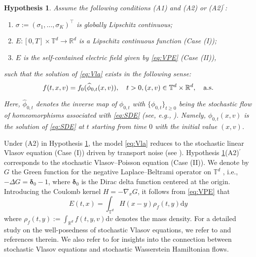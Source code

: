 \documentclass[11pt,reqno]{amsproc}
\newtheorem{hypothesis}[Def]{Hypothesis}
\newcommand{\ud}{\mathrm d}
\newcommand{\R}{\mathbb{R}}
\numberwithin{equation}{section}
\begin{document}
\begin{hypothesis}\label{Asp:1}
Assume the following conditions (A1) and (A2) or (A2)$^\prime$:
\begin{enumerate}
\item[(A1)\phantom{$^\prime$}] $\sigma:=(\sigma_1,\ldots,\sigma_K)^\top$ is globally Lipschitz continuous;
 \item[(A2)\phantom{$^\prime$}] $E:[0,T]\times\mathbb{T}^d\to \R^d$ is a Lipschitz continuous function (Case (I)); 
 \item[(A2)$^\prime$] $E$ is the self-contained electric field given by \eqref{eq:VPE} (Case (II)),
 \end{enumerate}
 such that the solution of \eqref{eq:Vla} exists in the following sense:
 \begin{equation*}
f(t,x,v)=f_0(\widehat{\phi}_{0,t}(x,v)),\quad t>0, (x,v)\in\mathbb{T}^d\times\R^d,\quad \textup{a.s.}
\end{equation*}

Here, $\widehat{\phi}_{0,t}$ denotes the inverse map of $\phi_{0,t}$ with
$\{\phi_{0,t}\}_{t\ge 0}$ being the stochastic flow of homeomorphisms associated with \eqref{eq:SDE} (see, e.g., \cite{KH19}). Namely, $\phi_{0,t}(x,v)$ is the solution of \eqref{eq:SDE} at $t$ starting from time $0$ with the initial value $(x,v)$.
\end{hypothesis}

Under (A2) in Hypothesis \ref{Asp:1},
the model \eqref{eq:Vla} reduces to the stochastic linear Vlasov equation (Case (I)) driven by transport noise (see \cite{BC24}). 
Hypothesis \ref{Asp:1}(A2)$^\prime$ corresponds to the stochastic Vlasov--Poisson equation (Case (II)). We denote by $G$ the Green function for the negative Laplace–Beltrami operator on $\mathbb T^d$
, i.e., $-\Delta G=\boldsymbol{\delta}_0-1$, where $\boldsymbol{\delta}_0$ is the Dirac delta function centered at the origin. Introducing the Coulomb kernel $H=-\nabla_xG$,
it follows from \eqref{eq:VPE} that 
\begin{equation*}
E(t,x)=\int_{\mathbb{T}^d} H(x-y)\rho_f(t,y)\ud y
\end{equation*}
where $\rho_f(t,y):=\int_{\R^d}f(t,y,v)\ud v$ denotes the mass density. 
For a detailed study on the well-posedness of stochastic Vlasov equations, we refer to \cite{BC24,DFV14} and references therein. We also refer to \cite{CLZ20,CLZ24} for 
insights into the connection between stochastic Vlasov equations and stochastic Wasserstein Hamiltonian flows. 
\end{document}
